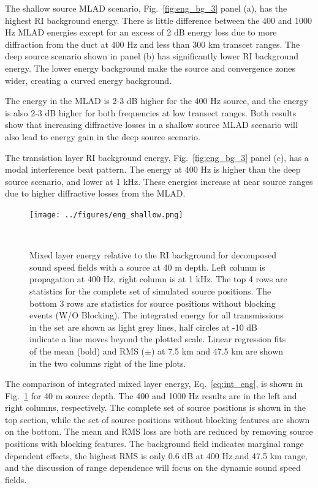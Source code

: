 \documentclass[preprint,NumberedRefs]{JASA}
\begin{document}
The shallow source MLAD scenario, Fig.~\ref{fig:eng_bg_3} panel (a), has the highest RI background energy. There is little difference between the 400 and 1000 Hz MLAD energies except for an excess of 2 dB energy loss due to more diffraction from the duct at 400 Hz and less than 300 km transcet ranges. The deep source scenario shown in panel (b) has significantly lower RI background energy. The lower energy background make the source and convergence zones wider, creating a curved energy background.

The energy in the MLAD is 2-3 dB higher for the 400 Hz source, and the energy is also 2-3 dB higher for both frequencies at low transect ranges. Both results show that increasing diffractive losses in a shallow source MLAD scenario will also lead to energy gain in the deep source scenario.

The transistion layer RI background energy, Fig.~\ref{fig:eng_bg_3} panel (c), has a modal interference beat pattern. The energy at 400 Hz is higher than the deep source scenario, and lower at 1 kHz. These energies increase at near source ranges due to higher diffractive losses from the MLAD.

\begin{figure}
\texttt{[image: ../figures/eng\_shallow.png]}
    \caption{Mixed layer energy relative to the RI background for decomposed sound speed fields with a source at 40 m depth. Left column is propagation at 400 Hz, right column is at 1 kHz. The top 4 rows are statistics for the complete set of simulated source positions. The bottom 3 rows are statistics for source positions without blocking events (W/O Blocking). The integrated energy for all transmissions in the set are shown as light grey lines, half circles at -10 dB indicate a line moves beyond the plotted scale. Linear regression fits of the mean (bold) and RMS ($\pm$) at 7.5 km and 47.5 km are shown in the two columns right of the line plots.}
    \label{fig:shal_eng}
\end{figure}

The comparison of integrated mixed layer energy, Eq.~\eqref{eq:int_eng}, is shown in Fig.~\ref{fig:shal_eng} for 40 m source depth. The 400 and 1000 Hz results are in the left and right columns, respectively. The complete set of source positions is shown in the top section, while the set of source positions without blocking features are shown on the bottom. The mean and RMS loss are both are reduced by removing source positions with blocking features. The background field indicates marginal range dependent effects, the highest RMS is only 0.6 dB at 400 Hz and 47.5 km range, and the discussion of range dependence will focus on the dynamic sound speed fields.
\end{document}
